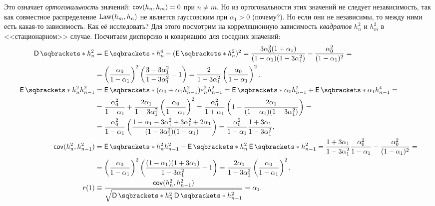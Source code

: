 Это означает \emph{ортогональность} значений: \(\operatorname{\mathsf{cov}}(h_{n}, h_{m}) = 0\) при 
\(n \neq m\). Но из ортогональности этих значений не следует независимость, так 
как совместное распределение \(\operatorname{Law}(h_{m}, h_{n})\) не является гауссовским при 
\(\alpha_{1} > 0\) (почему?). Но если они не независимы, то между ними есть 
какая-то зависимость. Как её исследовать? Для этого посмотрим на корреляционную 
зависимость \emph{квадратов} \(h_{n}^{2}\) и \(h_{m}^{2}\) в <<стационарном>> 
случае. Посчитаем дисперсию и ковариацию для соседних значений:
\begin{align*}
	\D{h_{n}^{2}} &= \E{h_{n}^{4}} - (\E{h_{n}^{2}})^{2} = 
	\frac{3\alpha_{0}^{2}(1 + \alpha_{1})}{(1 - \alpha_{1})(1 - 
	3\alpha_{1}^{2})} - \frac{\alpha_{0}^{2}}{(1 - \alpha_{1})^{2}} = \\
	&= \left(\frac{\alpha_{0}}{1 - \alpha_{1}}\right)^{2}\left(\frac{3 - 
	3\alpha_{1}^{2}}{1 - 3\alpha_{1}^{2}} - 1\right) = \frac{2}{1 - 
	3\alpha_{1}^{2}}\left(\frac{\alpha_{0}}{1 - \alpha_{1}}\right)^{2}. \\
	\E{h_{n}^{2}h_{n - 1}^{2}} &= \E{(\alpha_{0} + \alpha_{1}h_{n - 
	1}^{2})\epsilon_{n}^{2}h_{n - 1}^{2}} = \E{\alpha_{0}h_{n - 1}^{2}} + 
	\E{\alpha_{1}h_{n - 1}^{4}} = \\
	&= \frac{\alpha_{0}^{2}}{1 - \alpha_{1}} + \frac{2\alpha_{1}}{1 - 
	3\alpha_{1}^{2}}\left(\frac{\alpha_{0}}{1 - \alpha_{1}}\right)^{2} = 
	\frac{\alpha_{0}^{2}}{1 + \alpha_{1}}\left(1 - \frac{2\alpha_{1}}{(1 - 
	\alpha_{1})(1 - 3\alpha_{1}^{2})}\right) = \\
	&= \frac{\alpha_{0}^{2}}{1 - \alpha_{1}}\left(\frac{1 - \alpha_{1} - 
	3\alpha_{1}^{2} + 3\alpha_{1}^{2} + 2\alpha_{1}}{(1 - 3\alpha_{1}^{2})(1 - 
	\alpha_{1})}\right) =  \frac{\alpha_{0}^{2}}{1 - \alpha_{1}}\frac{1 + 
	3\alpha_{1}}{1 - 3\alpha_{1}^{2}}, \\
	\cov(h_{n}^{2}, h_{n - 1}^{2}) &= \E{h_{n}^{2}h_{n - 1}^{2}} - 
	\E{h_{n}^{2}}\E{h_{n - 1}^{2}} = \frac{1 + 3\alpha_{1}}{1 - 
	3\alpha_{1}^{2}}\frac{\alpha_{0}^{2}}{1 - \alpha_{1}} - 
	\frac{\alpha_{0}^{2}}{(1 - \alpha_{1})^{2}} = \\
	&= \left(\frac{\alpha_{0}}{1 - \alpha_{1}}\right)^{2}\left(\frac{(1 - 
	\alpha_{1})(1 + 3\alpha_{1})}{1 - 3\alpha_{1}^{2}} - 1\right) = 
	\frac{2\alpha_{1}}{1 - 3\alpha_{1}^{2}}\left(\frac{\alpha_{0}}{1 - 
	\alpha_{1}}\right)^{2}, \\
	r(1) &\equiv \frac{\cov(h_{n}^{2}, h_{n - 1}^{2})}{\sqrt{\D{h_{n}^{2}} 
	\D{h_{n - 1}^{2}}}} = \alpha_{1}.
\end{align*}

